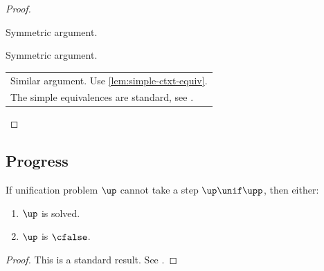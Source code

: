 \documentclass[acmsmall,screen,nonacm%
\Anonymous{,anonymous}{}%
\Final{}{,review}%
]{acmart}
\newcommand{\BBemlti}{Pottier-Remy/emlti} %
\providecommand{\DIFaddbegin}{} %
\providecommand{\DIFaddend}{} %
\providecommand{\DIFdelbegin}{} %
\providecommand{\DIFdelend}{} %
\begin{document}
\begin{proof}
\begin{proofcases}
\begin{proofcases}
\begin{proofcases}
      \proofcase{$\impliedby$}

      \begin{llproof}
	Symmetric argument.
      \end{llproof}


      \end{proofcases}



      \proofcase{$\impliedby$}

      \begin{llproof}
	Symmetric argument.
      \end{llproof}

    \end{proofcases}


  \begin{llproof}
    \DIFdelbegin %
\DIFdelend \DIFaddbegin \begin{tabular}{l}
    Similar argument. Use \cref{lem:simple-ctxt-equiv}. \\
    The simple equivalences are standard, see \citet*{\BBemlti}.
    \end{tabular}
  \DIFaddend \end{llproof}
  \end{proofcases}
\end{proof}

\subsection{Progress}

\begin{lemma}
  If unification problem $\up$ cannot take a step $\up \unif \upp$, then either:
  \begin{enumerate}[(\roman*)]
    \item $\up$ is solved.
    \item $\up$ is $\cfalse$.
    \end{enumerate}
  \begin{proof}
    This is a standard result. See \DIFdelbegin %
\DIFdelend \DIFaddbegin \citet*{\BBemlti}\DIFaddend .
  \end{proof}
\end{lemma}
\end{document}
